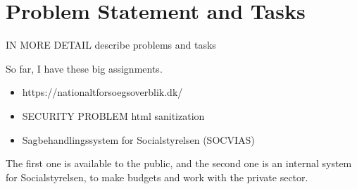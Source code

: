 \documentclass[../main.tex]{subfiles}
\begin{document}
\section{Problem Statement and Tasks}

IN MORE DETAIL describe problems and tasks 

So far, I have these big assignments. 

\begin{itemize}
    \item  https://nationaltforsoegsoverblik.dk/ 
    \item SECURITY PROBLEM html sanitization 
    \item Sagbehandlingssystem for Socialstyrelsen (SOCVIAS) 
\end{itemize}

The first one is available to the public, and the second one is an internal system for Socialstyrelsen, to make budgets and work with the private sector. 
\end{document}
